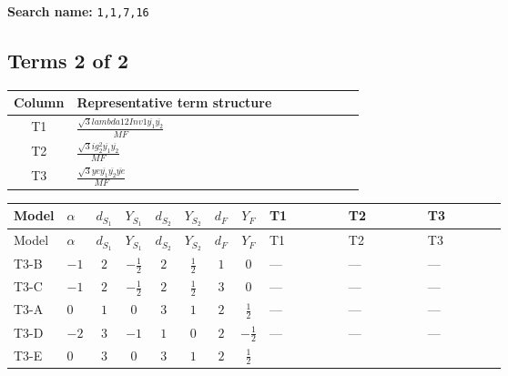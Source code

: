 \documentclass[8pt]{article}
\begin{document}
\begin{landscape}
\begin{longtable}{@{}llcccccc >{\raggedright\arraybackslash}p{0.21\linewidth} >{\raggedright\arraybackslash}p{0.21\linewidth} >{\raggedright\arraybackslash}p{0.21\linewidth}@{}}
\midrule
\bottomrule
\end{longtable}
\clearpage
\noindent\textbf{Search name: }\texttt{1,1,7,16}\par\smallskip
\subsection*{Terms 2 of 2}
\begin{center}
\begin{tabular}{@{}c >{\raggedright\arraybackslash}p{0.82\linewidth}@{}}
\toprule
Column & Representative term structure \\
\midrule
T1 & \(\displaystyle \frac{\sqrt{3} lambda12Inv1 \overline{y_{1}} \overline{y_{2}}}{MF}\) \\
\midrule
T2 & \(\displaystyle \frac{\sqrt{3} i g_{2}^{2} \overline{y_{1}} \overline{y_{2}}}{MF}\) \\
\midrule
T3 & \(\displaystyle \frac{\sqrt{3} ye \overline{y_{1}} \overline{y_{2}} \overline{ye}}{MF}\) \\
\midrule
\bottomrule
\end{tabular}
\end{center}
\smallskip
\tiny
\begin{longtable}{@{}llcccccc >{\raggedright\arraybackslash}p{0.21\linewidth} >{\raggedright\arraybackslash}p{0.21\linewidth} >{\raggedright\arraybackslash}p{0.21\linewidth}@{}}
\toprule
Model & $\alpha$ & $d_{S_1}$ & $Y_{S_1}$ & $d_{S_2}$ & $Y_{S_2}$ & $d_F$ & $Y_F$ & T1 & T2 & T3 \\
\midrule
\endfirsthead
\toprule
Model & $\alpha$ & $d_{S_1}$ & $Y_{S_1}$ & $d_{S_2}$ & $Y_{S_2}$ & $d_F$ & $Y_F$ & T1 & T2 & T3 \\
\midrule
\endhead
T3-B & $-1$ & $2$ & $-\frac{1}{2}$ & $2$ & $\frac{1}{2}$ & $1$ & $0$ & --- & --- & --- \\
\midrule
T3-C & $-1$ & $2$ & $-\frac{1}{2}$ & $2$ & $\frac{1}{2}$ & $3$ & $0$ & --- & --- & --- \\
\midrule
T3-A & $0$ & $1$ & $0$ & $3$ & $1$ & $2$ & $\frac{1}{2}$ & --- & --- & --- \\
\midrule
T3-D & $-2$ & $3$ & $-1$ & $1$ & $0$ & $2$ & $-\frac{1}{2}$ & --- & --- & --- \\
\midrule
T3-E & $0$ & $3$ & $0$ & $3$ & $1$ & $2$ & $\frac{1}{2}$ & \scriptsize\adjustbox{max width=\linewidth}{$\begin{gathered} \frac{\sqrt{3} lambda12Inv1 \overline{y_{1}} \overline{y_{2}}}{6 MF}\end{gathered}$} & \scriptsize\adjustbox{max width=\linewidth}{$\begin{gathered} \frac{\sqrt{3} i g_{2}^{2} \overline{y_{1}} \overline{y_{2}}}{6 MF}\end{gathered}$} & \scriptsize\adjustbox{max width=\linewidth}{$\begin{gathered} \frac{\sqrt{3} ye \overline{y_{1}} \overline{y_{2}} \overline{ye}}{12 MF}\end{gathered}$} \\
\midrule
\bottomrule
\end{longtable}
\clearpage

\end{landscape}
\end{document}
